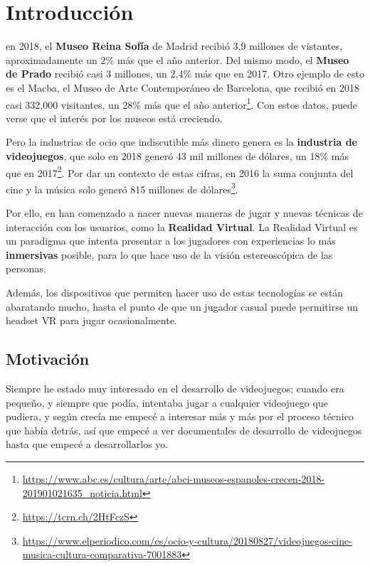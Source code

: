 \chapter{Introducción}
\label{chap:introduccion}

 en 2018, el \textbf{Museo Reina Sofía} de Madrid recibió 3,9 millones de vistantes, aproximadamente un 2\% más que el año anterior. Del mismo modo, el \textbf{Museo de Prado} recibió casi 3 millones, un 2,4\% más que en 2017. Otro ejemplo de esto es el Macba, el Museo de Arte Contemporáneo de Barcelona, que recibió en 2018 casi 332,000 visitantes, un 28\% más que el año anterior\footnote{\url{https://www.abc.es/cultura/arte/abci-museos-espanoles-crecen-2018-201901021635_noticia.html}}. Con estos datos, puede verse que el interés por los museos está creciendo.

Pero la industrias de ocio que indiscutible más dinero genera es la \textbf{industria de videojuegos}, que solo en 2018 generó 43 mil millones de dólares, un 18\% más que en 2017\footnote{\url{https://tcrn.ch/2HtFczS}}. Por dar un contexto de estas cifras, en 2016 la suma conjunta del cine y la música solo generó 815 millones de dólares\footnote{\url{https://www.elperiodico.com/es/ocio-y-cultura/20180827/videojuegos-cine-musica-cultura-comparativa-7001883}}.

Por ello, en han comenzado a nacer nuevas maneras de jugar y nuevas técnicas de interacción con los usuarios, como la \textbf{Realidad Virtual}. La Realidad Virtual es un paradigma que intenta presentar a los jugadores con experiencias lo más \textbf{inmersivas} posible, para lo que hace uso de la visión estereoscópica de las personas.

Además, los dispositivos que permiten hacer uso de estas tecnologías se están abaratando mucho, hasta el punto de que un jugador casual puede permitirse un headset \acs{VR} para jugar ocasionalmente. 

\section{Motivación}

Siempre he estado muy interesado en el desarrollo de videojuegos; cuando era pequeño, y siempre que podía, intentaba jugar a cualquier videojuego que pudiera, y según crecía me empecé a interesar más y más por el proceso técnico que había detrás, así que empecé a ver documentales de desarrollo de videojuegos hasta que empecé a desarrollarlos yo.


